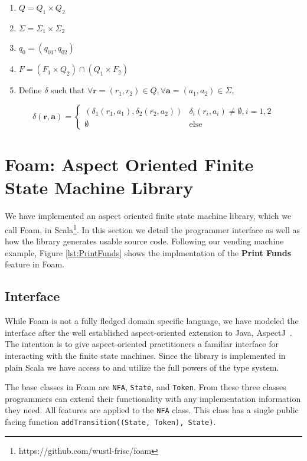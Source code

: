\documentclass[sigplan,anonymous,review]{acmart}
\begin{document}
\begin{enumerate}
    \item $Q = Q_1 \times Q_2$
    \item $\Sigma = \Sigma_1 \times \Sigma_2$
    \item $q_0 = (q_{01}, q_{02})$
    \item $F = (F_1 \times Q_2) \cap (Q_1 \times F_2)$
    \item Define $\delta$ such that $\forall \mathbf{r} = (r_1, r_2) \in Q, \forall \mathbf{a} = (a_1, a_2) \in \Sigma,$ 
\end{enumerate}
\[\delta(\mathbf r, \mathbf a) = \begin{cases}
    (\delta_1(r_1, a_1), \delta_2(r_2, a_2)) & \delta_i(r_i, a_i) \neq \emptyset, i = 1, 2\\
    \emptyset & \mathrm{else}
\end{cases}\]


\section{Foam: Aspect Oriented Finite State Machine Library}
We have implemented an aspect oriented finite state machine library, which we call Foam,  in Scala\footnote{https://github.com/wustl-frisc/foam}. In this section we detail the programmer interface as well as how the library generates usable source code. Following our vending machine example, Figure \ref{lst:PrintFunds} shows the implmentation of the \textbf{Print Funds} feature in Foam.

\subsection{Interface}
While Foam is not a fully fledged domain specific language, we have modeled the interface after the well established aspect-oriented extension to Java, AspectJ~\cite{}. The intention is to give aspect-oriented practitioners a familiar interface for interacting with the finite state machines. Since the library is implemented in plain Scala we have access to and utilize the full powers of the type system. 

The base classes in Foam are \texttt{NFA}, \texttt{State}, and \texttt{Token}. From these three classes programmers can extend their functionality with any implementation information they need. All features are applied to the \texttt{NFA} class. This class has a single public facing function \texttt{addTransition((State, Token), State)}.
\end{document}

